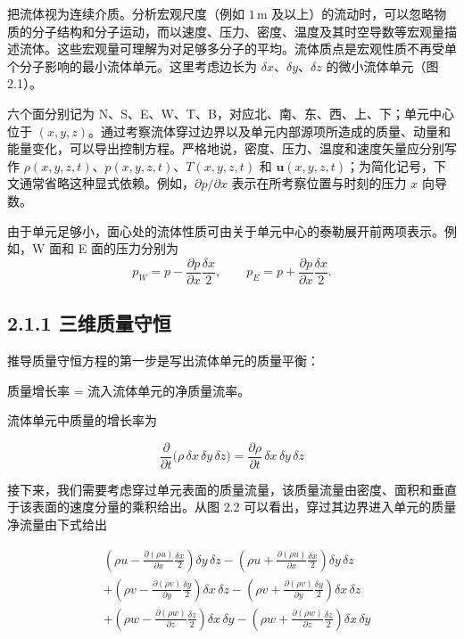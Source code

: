 \documentclass[11pt,a4paper,openany,fontset=none]{ctexbook}
\begin{document}
把流体视为连续介质。分析宏观尺度（例如 $1\,\mathrm{m}$ 及以上）的流动时，可以忽略物质的分子结构和分子运动，而以速度、压力、密度、温度及其时空导数等宏观量描述流体。这些宏观量可理解为对足够多分子的平均。流体质点是宏观性质不再受单个分子影响的最小流体单元。这里考虑边长为 $\delta x$、$\delta y$、$\delta z$ 的微小流体单元（图 2.1）。

六个面分别记为 N、S、E、W、T、B，对应北、南、东、西、上、下；单元中心位于 $(x,y,z)$。通过考察流体穿过边界以及单元内部源项所造成的质量、动量和能量变化，可以导出控制方程。严格地说，密度、压力、温度和速度矢量应分别写作 $\rho(x,y,z,t)$、$p(x,y,z,t)$、$T(x,y,z,t)$ 和 $\boldsymbol{u}(x,y,z,t)$；为简化记号，下文通常省略这种显式依赖。例如，$\partial p/\partial x$ 表示在所考察位置与时刻的压力 $x$ 向导数。

由于单元足够小，面心处的流体性质可由关于单元中心的泰勒展开前两项表示。例如，W 面和 E 面的压力分别为
\begin{equation*}
p_W=p-\frac{\partial p}{\partial x}\frac{\delta x}{2},
\qquad
p_E=p+\frac{\partial p}{\partial x}\frac{\delta x}{2}.
\end{equation*}

\subsection*{2.1.1 三维质量守恒}

推导质量守恒方程的第一步是写出流体单元的质量平衡：

质量增长率 = 流入流体单元的净质量流率。

流体单元中质量的增长率为

\begin{equation}
\frac{\partial}{\partial t}\bigl(\rho\,\delta x\,\delta y\,\delta z\bigr)
=\frac{\partial\rho}{\partial t}\,\delta x\,\delta y\,\delta z
\tag{2.1}
\end{equation}

接下来，我们需要考虑穿过单元表面的质量流量，该质量流量由密度、面积和垂直于该表面的速度分量的乘积给出。从图 2.2 可以看出，穿过其边界进入单元的质量净流量由下式给出

\begin{equation}
\begin{aligned}
&\left(\rho u-\frac{\partial(\rho u)}{\partial x}\frac{\delta x}{2}\right)\delta y\,\delta z
-\left(\rho u+\frac{\partial(\rho u)}{\partial x}\frac{\delta x}{2}\right)\delta y\,\delta z \\
&+\left(\rho v-\frac{\partial(\rho v)}{\partial y}\frac{\delta y}{2}\right)\delta x\,\delta z
-\left(\rho v+\frac{\partial(\rho v)}{\partial y}\frac{\delta y}{2}\right)\delta x\,\delta z \\
&+\left(\rho w-\frac{\partial(\rho w)}{\partial z}\frac{\delta z}{2}\right)\delta x\,\delta y
-\left(\rho w+\frac{\partial(\rho w)}{\partial z}\frac{\delta z}{2}\right)\delta x\,\delta y
\end{aligned}
\tag{2.2}
\end{equation}
\end{document}
